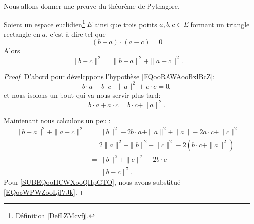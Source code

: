 Nous allons donner une preuve du théorème de Pythagore.

\begin{theorem}     \label{THOooHXHWooCpcDan}
	Soient un espace euclidien\footnote{Définition \ref{DefLZMcvfj}.} \( E\) ainsi que trois points \( a,b,c\in E\) formant un triangle rectangle en \( a\), c'est-à-dire tel que
	\begin{equation}        \label{EQooRAWAooBxlBcZ}
		(b-a)\cdot (a-c)=0
	\end{equation}
	Alors
	\begin{equation}
		\| b-c \|^2=\| b-a \|^2+\| a-c \|^2.
	\end{equation}
\end{theorem}

\begin{proof}
	D'abord pour développons l'hypothèse \eqref{EQooRAWAooBxlBcZ}:
	\begin{equation}
		b\cdot a-b\cdot c-\| a \|^2+a\cdot c=0,
	\end{equation}
	et nous isolons un bout qui va nous servir plus tard:
	\begin{equation}        \label{EQooWPWZooLjlVJk}
		b\cdot a+a\cdot c=b\cdot c+\| a \|^2.
	\end{equation}

	Maintenant nous calculons un peu :
	\begin{subequations}
		\begin{align}
			\| b-a \|^2+\| a-c \|^2 & =\| b \|^2-2b\cdot a+\| a \|^2+\| a \|-2a\cdot c+\| c \|^2                             \\
			                        & =2\| a \|^2+\| b \|^2+\| c \|^2-2(b\cdot c+\| a \|^2)      \label{SUBEQooHCWXooQHpGTO} \\
			                        & =\| b \|^2+\| c \|^2-2b\cdot c                                                         \\
			                        & =\| b-c \|^2.
		\end{align}
	\end{subequations}
	Pour \eqref{SUBEQooHCWXooQHpGTO}, nous avons substitué \eqref{EQooWPWZooLjlVJk}.
\end{proof}

